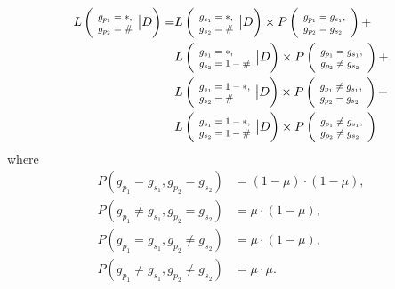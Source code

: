 \documentclass{bioinfo}
\newcommand*{\Scale}[2][4]{\scalebox{#1}{$#2$}}%
\begin{document}
\begin{enumerate}
\begin{equation*}
\begin{split}
L\left( \Scale[0.8]{ \begin{array}{l} g_{p_1} = *, \\g_{p_2} = \# \end{array}} \big{|} D\right) = & L\left(\Scale[0.8]{\begin{array}{l}g_{s_1} = *,\\ g_{s_2} = \# \end{array}} \big{|} D \right) \times P\left(\Scale[0.8]{\begin{array}{l}g_{p_1} = g_{s_1}, \\g_{p_2}= g_{s_2}\end{array}} \right)  + \\
                                         & L\left(\Scale[0.8]{\begin{array}{l}g_{s_1} = *, \\g_{s_2} = 1-\# \end{array}} \big{|} D \right) \times P\left(\Scale[0.8]{\begin{array}{l}g_{p_1} = g_{s_1}, \\g_{p_2} \neq g_{s_2}\end{array}} \right)  + \\
                                         & L\left(\Scale[0.8]{\begin{array}{l}g_{s_1} = 1-*, \\g_{s_2} = \# \end{array}} \big{|} D \right) \times P\left(\Scale[0.8]{\begin{array}{l}g_{p_1} \neq g_{s_1}, \\g_{p_2} = g_{s_2}\end{array}} \right)  + \\
                                         & L\left(\Scale[0.8]{\begin{array}{l}g_{s_1} = 1-*, \\g_{s_2} = 1-\# \end{array}} \big{|} D \right) \times P\left(\Scale[0.8]{\begin{array}{l}g_{p_1} \neq g_{s_1}, \\g_{p_2} \neq g_{s_2}\end{array}} \right)
\end{split}\label{eqn:gp_given_D:two}
\end{equation*}
where
\begin{align*}
P(g_{p_1} = g_{s_1}, g_{p_2} = g_{s_2})       & = (1-\mu)\cdot(1-\mu) , \\
P(g_{p_1} \neq g_{s_1}, g_{p_2} = g_{s_2})    & = \mu\cdot(1-\mu),\\
P(g_{p_1} = g_{s_1}, g_{p_2} \neq g_{s_2})    & = \mu\cdot(1-\mu),\\
P(g_{p_1} \neq g_{s_1}, g_{p_2} \neq g_{s_2}) & = \mu \cdot \mu.
\end{align*}



\end{enumerate}
\end{document}
